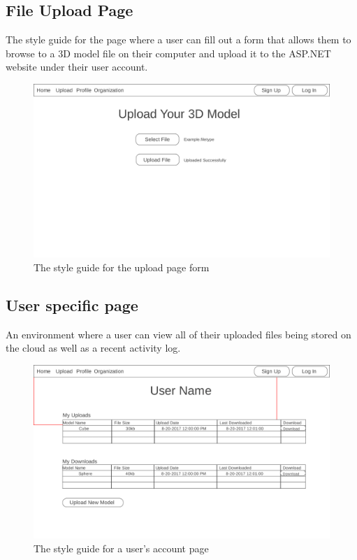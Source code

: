 \newpage
\subsection{File Upload Page}
    \hspace{7mm} The style guide for the page where a user can fill out a form 
    that allows them to browse to a 3D model file on their computer and upload
    it to the ASP.NET website under their user account.
    \ \\
    \label{fig:proto_web_upload}
    \begin{figure}[H]
        \centering \includegraphics[width=0.6\linewidth]{Upload}
        \caption{The style guide for the upload page form}
    \end{figure}

\subsection{User specific page}
    \hspace{7mm}
    An environment where a user can view all of their uploaded files being stored 
    on the cloud as well as a recent activity log.
    \ \\
    \label{fig:proto_web_user_page}
    \begin{figure}[H]
        \centering \includegraphics[width=0.6\linewidth]{UserPage}
        \caption{The style guide for a user's account page}
    \end{figure}

\newpage
